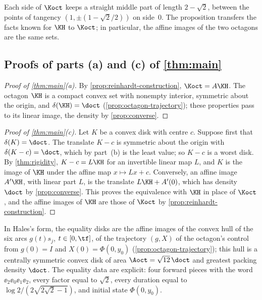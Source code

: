 Each side of $\Koct$ keeps a straight middle part of length $2-\sqrt2$, between the points of
tangency $(1,\pm(1-\sqrt2/2))$ on side~$0$. The proposition transfers the facts known for $\KH$ to
$\Koct$; in particular, the affine images of the two octagons are the same sets.

\subsection{Proofs of parts (a) and (c) of \texorpdfstring{\cref{thm:main}}{the main theorem}}\label{sec:equality-proofs}

\begin{proof}[Proof of \cref{thm:main}\textup{(a)}]
By \cref{prop:reinhardt-construction}, $\Koct=A\KH$. The octagon $\KH$ is a compact convex set
with nonempty interior, symmetric about the origin, and $\delta(\KH)=\doct$
(\cref{prop:octagon-trajectory}); these properties pass to its linear image, the density by
\cref{prop:converse}.
\end{proof}

\begin{proof}[Proof of \cref{thm:main}\textup{(c)}]
Let $K$ be a convex disk with centre $c$. Suppose first that $\delta(K)=\doct$. The translate
$K-c$ is symmetric about the origin with $\delta(K-c)=\doct$, which by part~(b) is the least
value; so $K-c$ is a worst disk. By
\cref{thm:rigidity}, $K-c=L\KH$ for an invertible linear map $L$, and $K$ is the image of $\KH$
under the affine map $x\mapsto Lx+c$. Conversely, an affine image $A'\KH$, with linear part $L$,
is the translate $L\KH+A'(0)$, which has density $\doct$ by \cref{prop:converse}. This proves the
equivalence with $\KH$ in place of $\Koct$, and the affine images of $\KH$ are those of $\Koct$
by \cref{prop:reinhardt-construction}.
\end{proof}

In Hales's form, the equality disks are the affine images of the convex hull of the six arcs
$g(t)s_j$, $t\in[0,\tf]$, of the trajectory $(g,X)$ of the octagon's control from $g(0)=I$ and
$X(0)=\Phi(0,y_0)$ (\cref{prop:octagon-trajectory}); this hull is a centrally symmetric convex
disk of area $\Aoct=\sqrt{12}\,\doct$ and greatest packing density $\doct$. The equality data are
explicit: four
forward pieces with the word $\ee_2\ee_0\ee_1\ee_2$, every factor equal to $\sqrt2$, every
duration equal to $\log2/(2\sqrt{2\sqrt2-1})$, and initial state $\Phi(0,y_0)$.
